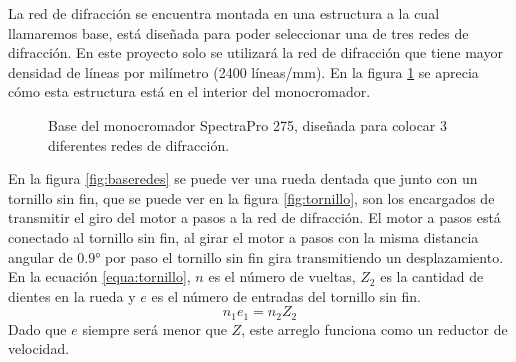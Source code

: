 La red de difracción se encuentra montada en una estructura a la cual llamaremos base, está diseñada para poder seleccionar una de tres redes de difracción. En este proyecto solo se utilizará la red de difracción que tiene mayor densidad de líneas por milímetro (2400 líneas/mm). En la figura \ref{fig:basered2} se aprecia cómo esta estructura está en el interior del monocromador.
\begin{figure}[h]
	\centering
	\caption{Base del monocromador SpectraPro 275, diseñada para colocar 3 diferentes redes de difracción.}
	\label{fig:basered2}
\end{figure}

En la figura \ref{fig:baseredes} se puede ver una rueda dentada que junto con un tornillo sin fin, que se puede ver en la figura \ref{fig:tornillo}, son los encargados de transmitir el giro del motor a pasos a la red de difracción. 
El motor a pasos está conectado al tornillo sin fin, al girar el motor a pasos con la misma distancia angular de $0.9°$ por paso el tornillo sin fin gira transmitiendo un desplazamiento. En la ecuación \ref{equa:tornillo}, $n$ es el número de vueltas, $Z_2$ es la cantidad de dientes en la rueda y $e$ es el número de entradas del tornillo sin fin.  
\begin{equation}
	n_1 e_1 = n_2 Z_2
	\label{equa:tornillo}
\end{equation}
Dado que $e$ siempre será menor que $Z$, este arreglo funciona como un reductor de velocidad.

